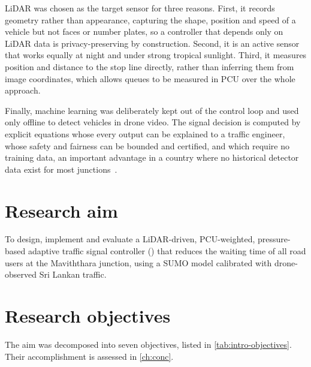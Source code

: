 LiDAR was chosen as the target sensor for three reasons. First, it records geometry rather than appearance, capturing the shape, position and speed of a vehicle but not faces or number plates, so a controller that depends only on LiDAR data is privacy-preserving by construction. Second, it is an active sensor that works equally at night and under strong tropical sunlight. Third, it measures position and distance to the stop line directly, rather than inferring them from image coordinates, which allows queues to be measured in PCU over the whole approach.

Finally, machine learning was deliberately kept out of the control loop and used only offline to detect vehicles in drone video. The signal decision is computed by explicit equations whose every output can be explained to a traffic engineer, whose safety and fairness can be bounded and certified, and which require no training data, an important advantage in a country where no historical detector data exist for most junctions~\cite{noaeen2022rl}.

\section{Research aim}\label{sec:intro-aim}

To design, implement and evaluate a LiDAR-driven, PCU-weighted, pressure-based adaptive traffic signal controller (\prism{}) that reduces the waiting time of all road users at the Maviththara junction, using a SUMO model calibrated with drone-observed Sri Lankan traffic.

\section{Research objectives}\label{sec:intro-objectives}

The aim was decomposed into seven objectives, listed in \cref{tab:intro-objectives}. Their accomplishment is assessed in \cref{ch:conc}.


